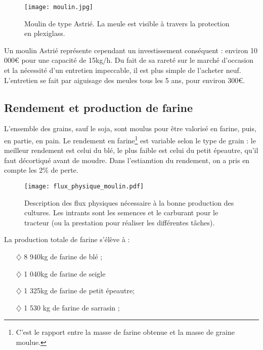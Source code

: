 \documentclass{book}
\begin{document}
\begin{figure}[h!]
\begin{center}
	\texttt{[image: moulin.jpg]}
	\caption{Moulin de type Astrié. La meule est visible à travers la protection en plexiglass.}
	\label{fig:moulin}
\end{center}
\end{figure}

Un moulin Astrié représente cependant un investissement conséquent : environ 10 000\euro{} pour une capacité de 15kg/h. Du fait de sa rareté sur le marché d'occasion et la nécessité d'un entretien impeccable, il est plus simple de l'acheter neuf. L'entretien se fait par aiguisage des meules tous les 5 ans, pour environ 300\euro{}.

\subsection{Rendement et production de farine}

L'ensemble des grains, sauf le soja, sont moulus pour être valorisé en farine, puis, en partie, en pain. Le rendement en farine\footnote{C'est le rapport entre la masse de farine obtenue et la masse de graine moulue.} est variable selon le type de grain : le meilleur rendement est celui du blé, le plus faible est celui du petit épeautre, qu'il faut décortiqué avant de moudre. Dans l'estiamtion du rendement, on a pris en compte les 2\% de perte.

\begin{figure}[h!]
\begin{center}
	\texttt{[image: flux\_physique\_moulin.pdf]}
	\caption{Description des flux physiques nécessaire à la bonne production des cultures. Les intrants sont les semences et le carburant pour le tracteur (ou la prestation pour réaliser les différentes tâches).}
	\label{fig:flux_moulin}
\end{center}
\end{figure}


La production totale de farine s'élève à :
\begin{itemize}

\item[$\diamondsuit$] 8 940kg de farine de blé ; 
\item[$\diamondsuit$] 1 040kg de farine de seigle
\item[$\diamondsuit$] 1 325kg de farine de petit épeautre; 
\item[$\diamondsuit$] 1 530 kg de farine de sarrasin ; 

\end{itemize}
\end{document}
